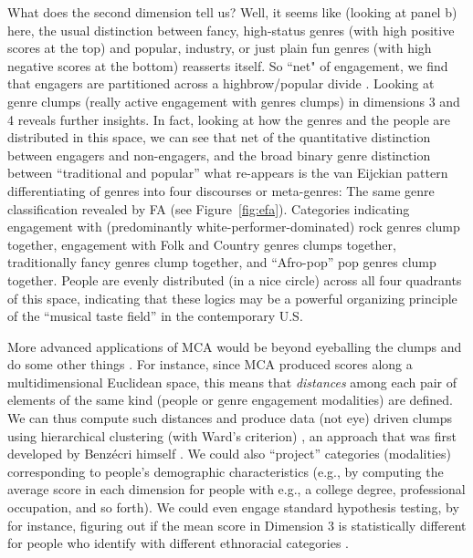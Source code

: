  What does the second dimension tell us? Well, it seems like (looking at panel b) here, the usual distinction between fancy, high-status genres (with high positive scores at the top) and popular, industry, or just plain fun genres (with high negative scores at the bottom) reasserts itself. So ``net" of engagement, we find that engagers are partitioned across a highbrow/popular divide \citep{roose_etal12, flemmen_etal18}. Looking at genre clumps (really active engagement with genres clumps) in dimensions 3 and 4 reveals further insights. In fact, looking at how the genres and the people are distributed in this space, we can see that net of the quantitative distinction between engagers and non-engagers, and the broad binary genre distinction between ``traditional and popular'' what re-appears is the van Eijckian pattern differentiating of genres into four discourses or meta-genres: The same genre classification revealed by FA (see Figure~\ref{fig:efa}). Categories indicating engagement with (predominantly white-performer-dominated) rock genres clump together, engagement with Folk and Country genres clumps together, traditionally fancy genres clump together, and ``Afro-pop'' pop genres clump together. People are evenly distributed (in a nice circle) across all four quadrants of this space, indicating that these logics may be a powerful organizing principle of the ``musical taste field'' \citep{savage_gayo11} in the contemporary U.S.
 
More advanced applications of MCA would be beyond eyeballing the clumps and do some other things \citep{leroux_rouanet04}. For instance, since MCA produced scores along a multidimensional Euclidean space, this means that {\em distances} among each pair of elements of the same kind (people or genre engagement modalities) are defined. We can thus compute such distances and produce data (not eye) driven clumps using hierarchical clustering (with Ward's criterion) \citep{becue-bertaut_pages08}, an approach that was first developed by Benz\'{e}cri himself \citep{leroux_rouanet04}. We could also ``project'' categories (modalities) corresponding to people's demographic characteristics (e.g., by computing the average score in each dimension for people with e.g., a college degree, professional occupation, and so forth). We could even engage standard hypothesis testing, by for instance, figuring out if the mean score in Dimension 3 is statistically different for people who identify with different ethnoracial categories \citep{flemmen_etal18}.
 
